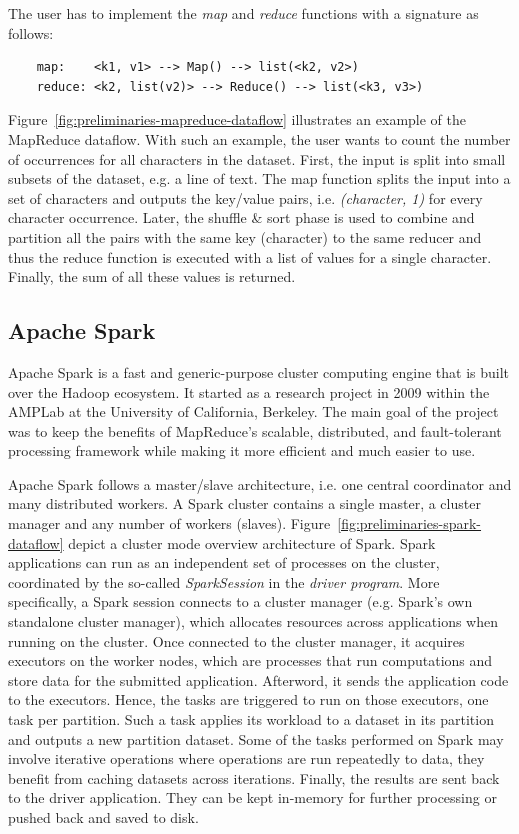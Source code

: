 The user has to implement the \textit{map} and \textit{reduce} functions with a signature as follows:

\begin{verbatim}
    map:    <k1, v1> --> Map() --> list(<k2, v2>)
    reduce: <k2, list(v2)> --> Reduce() --> list(<k3, v3>)
\end{verbatim}

Figure~\ref{fig:preliminaries-mapreduce-dataflow} illustrates an example of the MapReduce dataflow.
With such an example, the user wants to count the number of occurrences for all characters in the dataset.
First, the input is split into small subsets of the dataset, e.g. a line of text.
The map function splits the input into a set of characters and outputs the key/value pairs, i.e. \textit{(character, 1)} for every character occurrence.
Later, the shuffle \& sort phase is used to combine and partition all the pairs with the same key (character) to the same reducer and thus the reduce function is executed with a list of values for a single character.
Finally, the sum of all these values is returned.

\subsection{Apache Spark}
Apache Spark is a fast and generic-purpose cluster computing engine that is built over the Hadoop ecosystem.
It started as a research project in 2009 within the AMPLab at the University of California, Berkeley.
The main goal of the project was to keep the benefits of MapReduce's scalable, distributed, and fault-tolerant processing framework while making it more efficient and much easier to use.

Apache Spark follows a master/slave architecture, i.e. one central coordinator and many distributed workers.
A Spark cluster contains a single master, a cluster manager and any number of workers (slaves).
Figure~\ref{fig:preliminaries-spark-dataflow} depict a cluster mode overview architecture of Spark.
Spark applications can run as an independent set of processes on the cluster, coordinated by the so-called \textit{SparkSession} in the \textit{driver program}.
More specifically, a Spark session connects to a cluster manager (e.g. Spark's own standalone cluster manager), which allocates resources across applications when running on the cluster.
Once connected to the cluster manager, it acquires executors on the worker nodes, which are processes that run computations and store data for the submitted application.
Afterword, it sends the application code to the executors. 
Hence, the tasks are triggered to run on those executors, one task per partition.
Such a task applies its workload to a dataset in its partition and outputs a new partition dataset.
Some of the tasks performed on Spark may involve iterative operations where operations are run repeatedly to data, they benefit from caching datasets across iterations.
Finally, the results are sent back to the driver application.
They can be kept in-memory for further processing or pushed back and saved to disk.

